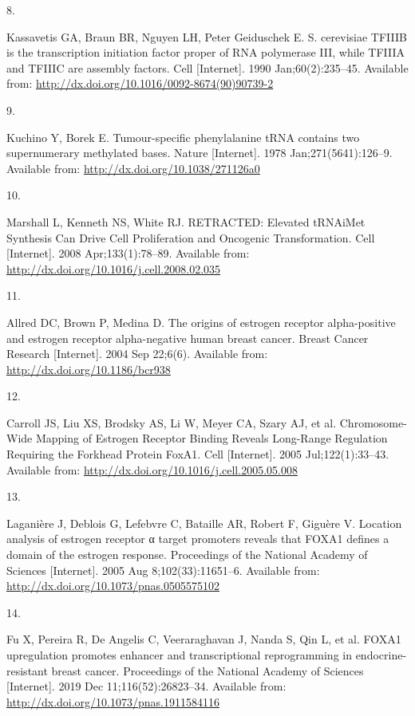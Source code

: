\documentclass[
  12pt,
]{article}
\newlength{\cslhangindent}
\newlength{\csllabelwidth}
\newlength{\cslentryspacingunit} %
\newenvironment{CSLReferences}[2] %
 {%
  \setlength{\parindent}{0pt}
  \ifodd #1
  \let\oldpar\par
  \def\par{\hangindent=\cslhangindent\oldpar}
  \fi
  \setlength{\parskip}{#2\cslentryspacingunit}
 }%
 {}
\newcommand{\CSLLeftMargin}[1]{\parbox[t]{\csllabelwidth}{#1}}
\newcommand{\CSLRightInline}[1]{\parbox[t]{\linewidth - \csllabelwidth}{#1}\break}
\begin{document}
\begin{CSLReferences}{0}{0}
\leavevmode{}%
\CSLLeftMargin{8. }%
\CSLRightInline{Kassavetis GA, Braun BR, Nguyen LH, Peter Geiduschek E. S. cerevisiae TFIIIB is the transcription initiation factor proper of RNA polymerase III, while TFIIIA and TFIIIC are assembly factors. Cell {[}Internet{]}. 1990 Jan;60(2):235--45. Available from: \url{http://dx.doi.org/10.1016/0092-8674(90)90739-2}}

\leavevmode{}%
\CSLLeftMargin{9. }%
\CSLRightInline{Kuchino Y, Borek E. Tumour-specific phenylalanine tRNA contains two supernumerary methylated bases. Nature {[}Internet{]}. 1978 Jan;271(5641):126--9. Available from: \url{http://dx.doi.org/10.1038/271126a0}}

\leavevmode{}%
\CSLLeftMargin{10. }%
\CSLRightInline{Marshall L, Kenneth NS, White RJ. RETRACTED: Elevated tRNAiMet Synthesis Can Drive Cell Proliferation and Oncogenic Transformation. Cell {[}Internet{]}. 2008 Apr;133(1):78--89. Available from: \url{http://dx.doi.org/10.1016/j.cell.2008.02.035}}

\leavevmode{}%
\CSLLeftMargin{11. }%
\CSLRightInline{Allred DC, Brown P, Medina D. The origins of estrogen receptor alpha-positive and estrogen receptor alpha-negative human breast cancer. Breast Cancer Research {[}Internet{]}. 2004 Sep 22;6(6). Available from: \url{http://dx.doi.org/10.1186/bcr938}}

\leavevmode{}%
\CSLLeftMargin{12. }%
\CSLRightInline{Carroll JS, Liu XS, Brodsky AS, Li W, Meyer CA, Szary AJ, et al. Chromosome-Wide Mapping of Estrogen Receptor Binding Reveals Long-Range Regulation Requiring the Forkhead Protein FoxA1. Cell {[}Internet{]}. 2005 Jul;122(1):33--43. Available from: \url{http://dx.doi.org/10.1016/j.cell.2005.05.008}}

\leavevmode{}%
\CSLLeftMargin{13. }%
\CSLRightInline{Laganière J, Deblois G, Lefebvre C, Bataille AR, Robert F, Giguère V. Location analysis of estrogen receptor α target promoters reveals that FOXA1 defines a domain of the estrogen response. Proceedings of the National Academy of Sciences {[}Internet{]}. 2005 Aug 8;102(33):11651--6. Available from: \url{http://dx.doi.org/10.1073/pnas.0505575102}}

\leavevmode{}%
\CSLLeftMargin{14. }%
\CSLRightInline{Fu X, Pereira R, De Angelis C, Veeraraghavan J, Nanda S, Qin L, et al. FOXA1 upregulation promotes enhancer and transcriptional reprogramming in endocrine-resistant breast cancer. Proceedings of the National Academy of Sciences {[}Internet{]}. 2019 Dec 11;116(52):26823--34. Available from: \url{http://dx.doi.org/10.1073/pnas.1911584116}}


\end{CSLReferences}
\end{document}
